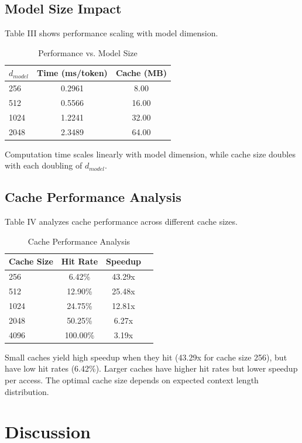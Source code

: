 \documentclass[conference]{IEEEtran}
\begin{document}
\subsection{Model Size Impact}

Table III shows performance scaling with model dimension.

\begin{table}[h]
\centering
\caption{Performance vs. Model Size}
\begin{tabular}{lcc}
\hline
\textbf{$d_{model}$} & \textbf{Time (ms/token)} & \textbf{Cache (MB)} \\
\hline
256 & 0.2961 & 8.00 \\
512 & 0.5566 & 16.00 \\
1024 & 1.2241 & 32.00 \\
2048 & 2.3489 & 64.00 \\
\hline
\end{tabular}
\end{table}

Computation time scales linearly with model dimension, while cache size doubles with each doubling of $d_{model}$.

\subsection{Cache Performance Analysis}

Table IV analyzes cache performance across different cache sizes.

\begin{table}[h]
\centering
\caption{Cache Performance Analysis}
\begin{tabular}{lccc}
\hline
\textbf{Cache Size} & \textbf{Hit Rate} & \textbf{Speedup} \\
\hline
256 & 6.42\% & 43.29x \\
512 & 12.90\% & 25.48x \\
1024 & 24.75\% & 12.81x \\
2048 & 50.25\% & 6.27x \\
4096 & 100.00\% & 3.19x \\
\hline
\end{tabular}
\end{table}

Small caches yield high speedup when they hit (43.29x for cache size 256), but have low hit rates (6.42\%). Larger caches have higher hit rates but lower speedup per access. The optimal cache size depends on expected context length distribution.

\section{Discussion}
\end{document}
